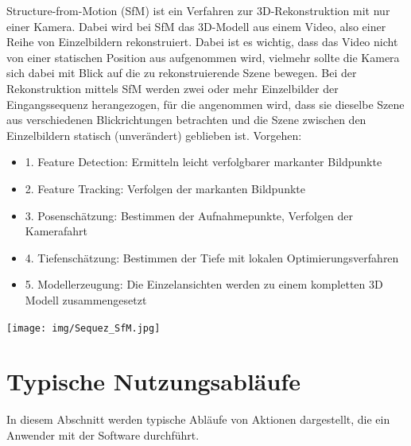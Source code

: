 Structure-from-Motion (SfM) ist ein Verfahren zur 3D-Rekonstruktion mit nur einer Kamera. Dabei wird bei SfM das 3D-Modell aus einem Video, also einer Reihe von Einzelbildern rekonstruiert. Dabei ist es wichtig, dass das Video nicht von einer statischen Position aus aufgenommen wird, vielmehr sollte die Kamera sich dabei mit Blick auf die zu rekonstruierende Szene bewegen. Bei der Rekonstruktion mittels SfM werden zwei oder mehr Einzelbilder der Eingangssequenz herangezogen, für die angenommen wird, dass sie dieselbe Szene aus verschiedenen Blickrichtungen betrachten und die Szene zwischen den Einzelbildern statisch (unverändert) geblieben ist.
Vorgehen:
\begin{itemize}
\item 1. Feature Detection: Ermitteln leicht verfolgbarer markanter Bildpunkte\item 2. Feature Tracking: Verfolgen der markanten Bildpunkte\item 3. Posenschätzung: Bestimmen der Aufnahmepunkte, Verfolgen der Kamerafahrt\item 4. Tiefenschätzung: Bestimmen der Tiefe mit lokalen Optimierungsverfahren\item 5. Modellerzeugung: Die Einzelansichten werden zu einem kompletten 3D Modell zusammengesetzt
\end{itemize}
\texttt{[image: img/Sequez\_SfM.jpg]} 

\section{Typische Nutzungsabläufe}

In diesem Abschnitt werden typische Abläufe von Aktionen dargestellt, die ein Anwender mit der Software durchführt.

